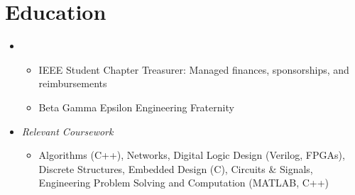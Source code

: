 \documentclass[11pt,letterpaper,sans]{moderncv}
\begin{document}
\makecvtitle

\vspace{-40pt}





\section{Education}
\vspace{5pt}


\begin{itemize}

\item[] {}
\vspace{-1mm}	\begin{itemize}
	 \item IEEE Student Chapter Treasurer: Managed finances, sponsorships, 
and reimbursements
	 \item Beta Gamma Epsilon Engineering Fraternity
	\end{itemize}
	
\item[] {\textit{Relevant Coursework}}
\vspace{-1mm} \begin{itemize}
               \item Algorithms (C++), Networks, Digital Logic Design 
		(Verilog, FPGAs), Discrete Structures, Embedded Design (C),
		Circuits \& Signals, Engineering Problem 
		Solving and Computation (MATLAB, C++)
              \end{itemize}


\end{itemize}
\end{document}
